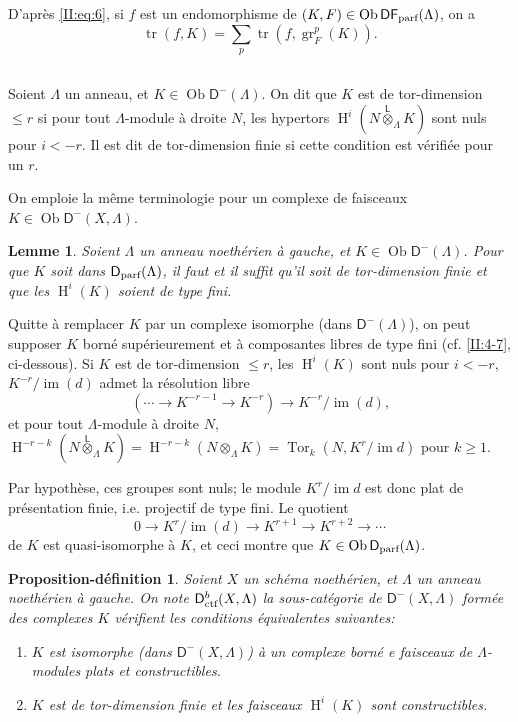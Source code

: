 \documentclass{book}
\DeclareMathOperator{\gr}{gr}
\DeclareMathOperator{\h}{H}
\DeclareMathOperator{\im}{im}
\DeclareMathOperator{\ob}{Ob}
\DeclareMathOperator{\tor}{Tor}
\DeclareMathOperator{\tr}{tr}
\newcommand{\D}{\mathsf{D}}
\newcommand{\lotimes}{{\overset{\mathsf{L}}{\otimes}}}
\newcommand{\dparf}{\mathsf{D}_{\textnormal{parf}}}
\newcommand{\dfparf}{\mathsf{DF}_{\textnormal{parf}}}
\newtheorem{lemma}[subsubsection]{Lemme}
\newtheorem{prop-def_}[subsection]{Proposition-définition}
\begin{document}
D'après \eqref{II:eq:6}, si $f$ est un endomorphisme de 
$(K,F)\in\ob\dfparf(\Lambda)$, on a 
\begin{equation}\label{II:eq:9}
 \tr(f,K) = \sum_p \tr(f,\gr_F^p(K)) \text{.}
\end{equation}





\subsection{}\label{II:4-5}

Soient $\Lambda$ un anneau, et $K\in\ob\D^-(\Lambda)$. On dit que $K$ est de 
tor-dimension $\leqslant r$ si pour tout $\Lambda$-module à droite $N$, les 
hypertors $\h^i(N\lotimes_\Lambda K)$ sont nuls pour $i<-r$. Il est dit de 
tor-dimension finie si cette condition est vérifiée pour un $r$. 

On emploie la même terminologie pour un complexe de faisceaux 
$K\in\ob\D^-(X,\Lambda)$. 





\begin{lemma}\label{II:4-5-1} 
Soient $\Lambda$ un anneau noethérien à gauche, et $K\in\ob\D^-(\Lambda)$. 
Pour que $K$ soit dans $\dparf(\Lambda)$, il faut et il suffit qu'il soit de 
tor-dimension finie et que les $\h^i(K)$ soient de type fini.
\end{lemma}

Quitte à remplacer $K$ par un complexe isomorphe (dans $\D^-(\Lambda)$), on 
peut supposer $K$ borné supérieurement et à composantes libres de type 
fini (cf. \ref{II:4-7}, ci-dessous). Si $K$ est de tor-dimension $\leqslant r$, 
les $\h^i(K)$ sont nuls pour $i<-r$, $K^{-r}/\im(d)$ admet la résolution 
libre 
\[
  (\cdots \to K^{-r-1} \to K^{-r}) \to K^{-r}/\im(d) \text{,}
\]
et pour tout $\Lambda$-module à droite $N$, 
$\h^{-r-k}(N\lotimes_\Lambda K) = \h^{-r-k}(N\otimes_\Lambda K) 
= \tor_k(N,K^r/\im d)$ pour $k\geqslant 1$. 

Par hypothèse, ces groupes sont nuls; le module $K^r/\im d$ est donc plat de 
présentation finie, i.e. projectif de type fini. Le quotient 
\[
  0 \to K^r/\im(d) \to K^{r+1} \to K^{r+2}\to \cdots 
\]
de $K$ est quasi-isomorphe à $K$, et ceci montre que $K\in\ob\dparf(\Lambda)$. 





\begin{prop-def_}\label{II:4-6}
Soient $X$ un sch\'ema noeth\'erien, et $\Lambda$ un anneau noeth\'erien \`a 
gauche. On note $\D_\textnormal{ctf}^b(X,\Lambda)$ la sous-cat\'egorie de 
$\D^-(X,\Lambda)$ form\'ee des complexes $K$ v\'erifient les conditions 
\'equivalentes suivantes:
\begin{enumerate}[\indent i)]
  \item $K$ est isomorphe (dans $\D^-(X,\Lambda)$) \`a un complexe born\'e e 
    faisceaux de $\Lambda$-modules plats et constructibles. 
  \item $K$ est de tor-dimension finie et les faisceaux $\h^i(K)$ sont 
    constructibles. 
\end{enumerate}
\end{prop-def_}
\end{document}
